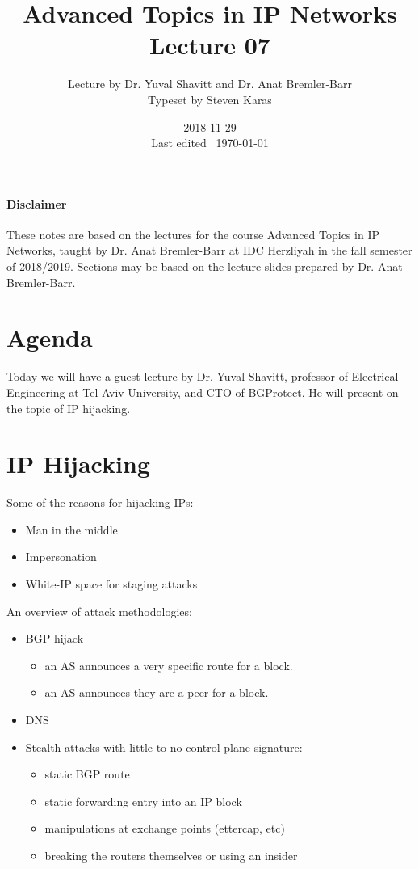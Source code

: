 \documentclass{idc_msc}
\title{Advanced Topics in IP Networks \\\large Lecture 07}
\date{2018-11-29 \\ Last edited \currenttime\ \today}
\author{Lecture by Dr. Yuval Shavitt and Dr. Anat Bremler-Barr\\Typeset by Steven Karas}
\begin{document}
\maketitle

\paragraph{Disclaimer}

These notes are based on the lectures for the course Advanced Topics in IP Networks, taught by Dr. Anat Bremler-Barr at IDC Herzliyah in the fall semester of 2018/2019.
Sections may be based on the lecture slides prepared by Dr. Anat Bremler-Barr.

\nocite{Varghese:2004:NAI:1203994}
\nocite{Crovella:2006:IMI:1196480}
\nocite{Kurose:2002:CNT:549735}

\section{Agenda}

Today we will have a guest lecture by Dr. Yuval Shavitt, professor of Electrical Engineering at Tel Aviv University, and CTO of BGProtect. He will present on the topic of IP hijacking.

\section{IP Hijacking}

Some of the reasons for hijacking IPs:

\begin{itemize}
  \item Man in the middle
  \item Impersonation
  \item White-IP space for staging attacks
\end{itemize}

An overview of attack methodologies:

\begin{itemize}
  \item BGP hijack
  \begin{itemize}
    \item an AS announces a very specific route for a block.
    \item an AS announces they are a peer for a block.
  \end{itemize}
  \item DNS
  \item Stealth attacks with little to no control plane signature:
  \begin{itemize}
    \item static BGP route
    \item static forwarding entry into an IP block
    \item manipulations at exchange points (ettercap, etc)
    \item breaking the routers themselves or using an insider
  \end{itemize}
\end{itemize}
\end{document}
